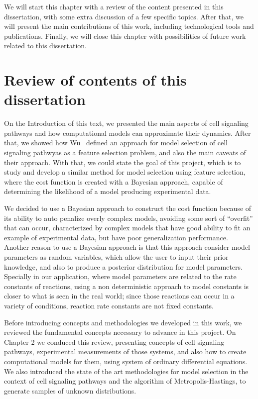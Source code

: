 We will start this chapter with a review of the content presented in 
this dissertation, with some extra discussion of a few specific topics.
After that, we will present the main contributions of this work,
including technological tools and publications. Finally, we will close
this chapter with possibilities of future work related to this
dissertation.


\section{Review of contents of this dissertation}
On the Introduction of this text, we presented the main aspects of cell
signaling pathways and how computational models can approximate their
dynamics. After that, we showed how Wu~\cite{Wu15} defined an approach
for model selection of cell signaling pathwyas as a feature selection
problem, and also the main caveats of their approach. With that, we
could state the goal of this project, which is to study and develop a
similar method for model selection using feature selection, where the 
cost function is created with a Bayesian approach, capable of
determining the likelihood of a model producing experimental data.


We decided to use a Bayesian approach to construct the cost function
because of its ability to auto penalize overly complex models, avoiding
some sort of ``overfit'' that can occur, characterized by complex models
that have good ability to fit an example of experimental data, but have 
poor generalization performance. Another reason to use a Bayesian
approach is that this approach consider model parameters as random 
variables, which allow the user to input their prior knowledge, and also
to produce a posterior distribution for model parameters. Specially in 
our application, where model parameters are related to the rate 
constants of reactions, using a non deterministic approach to model 
constants is closer to what is seen in the real world; since those 
reactions can occur in a variety of conditions, reaction rate constants
are not fixed constants.

Before introducing concepts and methodologies we developed in this work,
we reviewed the fundamental concepts necessary to advance in this 
project. On Chapter 2 we conduced this review, presenting concepts
of cell signaling pathways, experimental measurements of those systems, 
and also how to create computational models for them, using system of 
ordinary differential equations. We also introduced the state of the art
methodologies for model selection in the context of cell signaling
pathways and the algorithm of Metropolis-Hastings, to generate samples
of unknown distributions.

